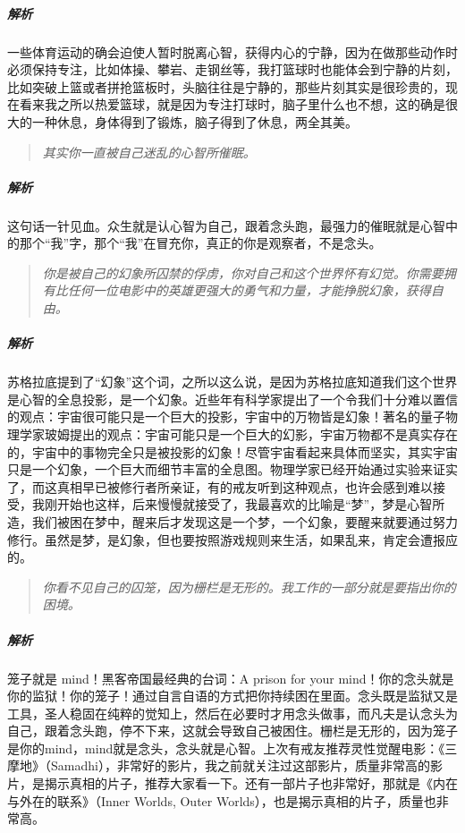 \subparagraph{解析} 一些体育运动的确会迫使人暂时脱离心智，获得内心的宁静，因为在做那些动作时必须保持专注，比如体操、攀岩、走钢丝等，我打篮球时也能体会到宁静的片刻，比如突破上篮或者拼抢篮板时，头脑往往是宁静的，那些片刻其实是很珍贵的，现在看来我之所以热爱篮球，就是因为专注打球时，脑子里什么也不想，这的确是很大的一种休息，身体得到了锻炼，脑子得到了休息，两全其美。

\begin{quote}\it
    其实你一直被自己迷乱的心智所催眠。
\end{quote}

\subparagraph{解析} 这句话一针见血。众生就是认心智为自己，跟着念头跑，最强力的催眠就是心智中的那个“我”字，那个“我”在冒充你，真正的你是观察者，不是念头。

\begin{quote}\it
    你是被自己的幻象所囚禁的俘虏，你对自己和这个世界怀有幻觉。你需要拥有比任何一位电影中的英雄更强大的勇气和力量，才能挣脱幻象，获得自由。
\end{quote}

\subparagraph{解析} 苏格拉底提到了“幻象”这个词，之所以这么说，是因为苏格拉底知道我们这个世界是心智的全息投影，是一个幻象。近些年有科学家提出了一个令我们十分难以置信的观点：宇宙很可能只是一个巨大的投影，宇宙中的万物皆是幻象！著名的量子物理学家玻姆提出的观点：宇宙可能只是一个巨大的幻影，宇宙万物都不是真实存在的，宇宙中的事物完全只是被投影的幻象！尽管宇宙看起来具体而坚实，其实宇宙只是一个幻象，一个巨大而细节丰富的全息图。物理学家已经开始通过实验来证实了，而这真相早已被修行者所亲证，有的戒友听到这种观点，也许会感到难以接受，我刚开始也这样，后来慢慢就接受了，我最喜欢的比喻是“梦”，梦是心智所造，我们被困在梦中，醒来后才发现这是一个梦，一个幻象，要醒来就要通过努力修行。虽然是梦，是幻象，但也要按照游戏规则来生活，如果乱来，肯定会遭报应的。

\begin{quote}\it
    你看不见自己的囚笼，因为栅栏是无形的。我工作的一部分就是要指出你的困境。
\end{quote}

\subparagraph{解析} 笼子就是 mind！黑客帝国最经典的台词：A prison for your mind！你的念头就是你的监狱！你的笼子！通过自言自语的方式把你持续困在里面。念头既是监狱又是工具，圣人稳固在纯粹的觉知上，然后在必要时才用念头做事，而凡夫是认念头为自己，跟着念头跑，停不下来，这就会导致自己被困住。栅栏是无形的，因为笼子是你的mind，mind就是念头，念头就是心智。上次有戒友推荐灵性觉醒电影：《三摩地》（Samadhi），非常好的影片，我之前就关注过这部影片，质量非常高的影片，是揭示真相的片子，推荐大家看一下。还有一部片子也非常好，那就是《内在与外在的联系》（Inner Worlds, Outer Worlds），也是揭示真相的片子，质量也非常高。

